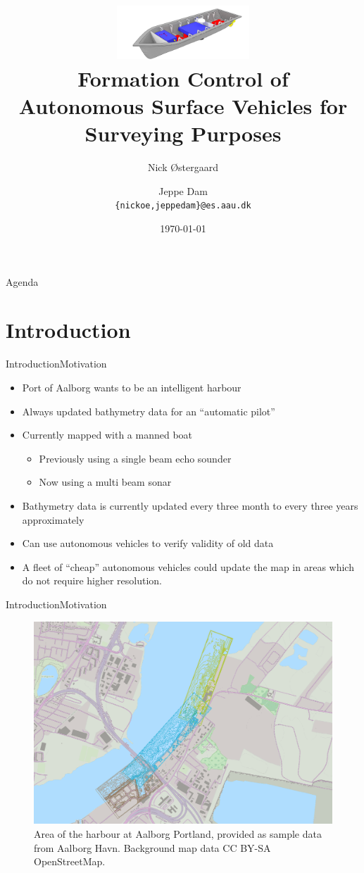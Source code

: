 \documentclass[10pt,handout]{beamer}
\title[]%
{\includegraphics[width=5cm]{../thesis/frontmatter/aauship}\\ Formation Control of\\Autonomous Surface Vehicles for\\Surveying Purposes}
\author[14gr1034]{%
  Nick Østergaard \and Jeppe Dam\\
  {{\tt \{nickoe,jeppedam\}@es.aau.dk}}
}
\institute[
  Dept.\ of Electronic Systems,\\
  Aalborg University,\\
  Denmark
] %
{%
  Department of Electronic Systems,\\
  Aalborg University,\\
  Denmark
  
}
\date{\today}
\begin{document}
\begin{frame}[plain] %
  \titlepage
\end{frame}

\begin{frame}{Agenda}{}
\tableofcontents
\end{frame}
\section{Introduction}
\begin{frame}{Introduction}{Motivation}
  \begin{itemize}
    \item Port of Aalborg wants to be an intelligent harbour
    \item Always updated bathymetry data for an ``automatic pilot''
    \item Currently mapped with a manned boat
    \begin{itemize}
      \item Previously using a single beam echo sounder
      \item Now using a multi beam sonar
    \end{itemize}
    \item Bathymetry data is currently updated every three month to every three years approximately
    \item Can use autonomous vehicles to verify validity of old data
    \item A fleet of ``cheap'' autonomous vehicles could update the map in areas which do not require higher resolution.
  \end{itemize}
\end{frame}

\begin{frame}{Introduction}{Motivation}
  \begin{figure}
	  \includegraphics[width=\textwidth]{../thesis/fig/use-case-data}
	  \caption{\scriptsize Area of the harbour at Aalborg Portland, provided as sample
	  data from Aalborg Havn. Background map data CC BY-SA OpenStreetMap.}
  \end{figure}
\end{frame}
\end{document}

